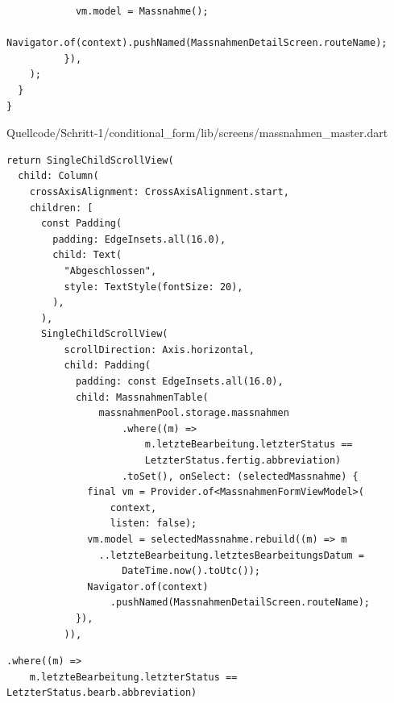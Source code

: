 {\begin{listing}[htbp]
\begin{verbatim}
            vm.model = Massnahme();
            Navigator.of(context).pushNamed(MassnahmenDetailScreen.routeName);
          }),
    );
  }
}

\end{verbatim}
   {Quellcode/Schritt-1/conditional_form/lib/screens/massnahmen_master.dart}
  \label{lst:Schritt1KlasseMassnahmenMasterScreenStruktur}
\end{listing}



\begin{listing}[htbp]
  \begin{verbatim}
return SingleChildScrollView(
  child: Column(
    crossAxisAlignment: CrossAxisAlignment.start,
    children: [
      const Padding(
        padding: EdgeInsets.all(16.0),
        child: Text(
          "Abgeschlossen",
          style: TextStyle(fontSize: 20),
        ),
      ),
      SingleChildScrollView(
          scrollDirection: Axis.horizontal,
          child: Padding(
            padding: const EdgeInsets.all(16.0),
            child: MassnahmenTable(
                massnahmenPool.storage.massnahmen
                    .where((m) =>
                        m.letzteBearbeitung.letzterStatus ==
                        LetzterStatus.fertig.abbreviation)
                    .toSet(), onSelect: (selectedMassnahme) {
              final vm = Provider.of<MassnahmenFormViewModel>(
                  context,
                  listen: false);
              vm.model = selectedMassnahme.rebuild((m) => m
                ..letzteBearbeitung.letztesBearbeitungsDatum =
                    DateTime.now().toUtc());
              Navigator.of(context)
                  .pushNamed(MassnahmenDetailScreen.routeName);
            }),
          )),
        \end{verbatim}
  \caption[Schritt 1 Ausgabe der finalen Maßnahmen]{Die Ausgabe der finalen Maßnahmen, Quelle: Eigenes Listing, \newline Datei: Quellcode/Schritt-1/conditional_form/lib/screens/massnahmen_master.dart}

  \label{lst:Schritt1AusgabeDerFinalenMaßnahmen}
\end{listing}


\begin{listing}[htbp]
  \begin{verbatim}
.where((m) =>
    m.letzteBearbeitung.letzterStatus == LetzterStatus.bearb.abbreviation)
\end{verbatim}
  \caption[Schritt 1 Bedingung der Entwurf-Maßnahmen]{Die Bedingung der Entwurf-Maßnahmen, Quelle: Eigenes Listing, \newline Datei: Quellcode/Schritt-1/conditional_form/lib/screens/massnahmen_master.dart}
  \label{lst:Schritt1BedingungDerEntwurfMaßnahmen}
\end{listing}

}
